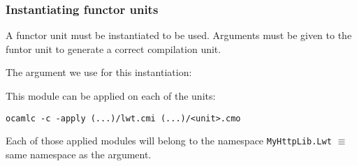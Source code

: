 \documentclass{beamer}
\begin{document}
\begin{frame}[fragile]
\frametitle{Instantiating functor units}

 {
  A functor unit must be instantiated to be used. Arguments must be given to the
  funtor unit to generate a correct compilation unit.
}


 {
  The argument we use for this instantiation:
  \medskip
  \lwtbinding
}

 {
  This module can be applied on each of the units:
  
  \begin{block}{}
    \texttt{ocamlc -c -apply (...)/lwt.cmi (...)/<unit>.cmo}
  \end{block}

  \medskip

  Each of those applied modules will belong to the namespace
  \texttt{MyHttpLib.Lwt} $\equiv$ same namespace as the argument. 
}

\end{frame}




\end{document}
